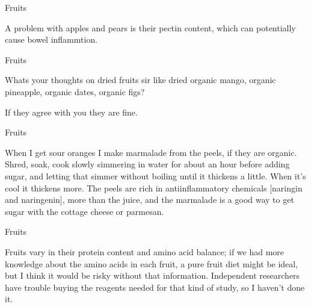 \documentclass[11pt,oneside,openany,extrafontsizes]{memoir}
\begin{document}
\begin{standalonequote}{Fruits}

    \begin{answer}
      A problem with apples and pears is their pectin content, which can potentially cause bowel inflammtion.
    \end{answer}
\end{standalonequote}

\begin{qaexchange}{Fruits}

    \begin{question}
        Whats your thoughts on dried fruits sir like dried organic mango, organic pineapple, organic dates, organic figs?
    \end{question}

    \begin{answer}
      If they agree with you they are fine.
    \end{answer}
\end{qaexchange}

\begin{standalonequote}{Fruits}

    \begin{answer}
      When I get sour oranges I make marmalade from the peels, if they are organic. Shred, soak, cook slowly simmering in water for about an hour before adding sugar, and letting that simmer without boiling until it thickens a little. When it's cool it thickens more. The peels are rich in antiinflammatory chemicals [naringin and naringenin], more than the juice, and the marmalade is a good way to get sugar with the cottage cheese or parmesan.
    \end{answer}
\end{standalonequote}

\begin{standalonequote}{Fruits}

    \begin{answer}
      Fruits vary in their protein content and amino acid balance; if we had more knowledge about the amino acids in each fruit, a pure fruit diet might be ideal, but I think it would be risky without that information. Independent researchers have trouble buying the reagents needed for that kind of study, so I haven't done it.
    \end{answer}
\end{standalonequote}
\end{document}
